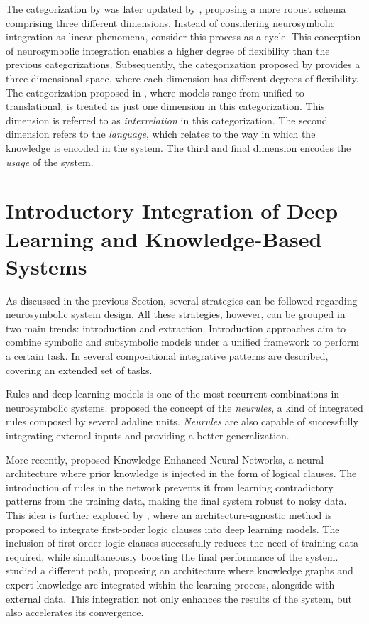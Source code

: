 The categorization by \cite{hilario_overview_nodate} was later updated by \cite{bader_dimensions_2005}, proposing a more robust schema comprising three different dimensions. Instead of considering neurosymbolic integration as linear phenomena, \cite{bader_dimensions_2005} consider this process as a cycle. This conception of neurosymbolic integration enables a higher degree of flexibility than the previous categorizations. Subsequently, the categorization proposed by \cite{bader_dimensions_2005} provides a three-dimensional space, where each dimension has different degrees of flexibility. The categorization proposed in \cite{hilario_overview_nodate}, where models range from unified to translational, is treated as just one dimension in this categorization. This dimension is referred to as \textit{interrelation} in this categorization. The second dimension refers to the \textit{language}, which relates to the way in which the knowledge is encoded in the system. The third and final dimension encodes the \textit{usage} of the system.

\section{Introductory Integration of Deep Learning and Knowledge-Based Systems}  \label{sec:sota_dl_kb_intregration}

As discussed in the previous Section, several strategies can be followed regarding neurosymbolic system design. All these strategies, however, can be grouped in two main trends: introduction and extraction. Introduction approaches aim to combine symbolic and subsymbolic models under a unified framework to perform a certain task. In \cite{van_bekkum_modular_2021} several compositional integrative patterns are described, covering an extended set of tasks. 

Rules and deep learning models is one of the most recurrent combinations in neurosymbolic systems. \cite{hatzilygeroudis_integrated_2010} proposed the concept of the \textit{neurules}, a kind of integrated rules composed by several adaline units. \textit{Neurules} are also capable of successfully integrating external inputs and providing a better generalization. 

More recently, \cite{daniele_knowledge_2019} proposed Knowledge Enhanced Neural Networks, a neural architecture where prior knowledge is injected in the form of logical clauses. The introduction of rules in the network prevents it from learning contradictory patterns from the training data, making the final system robust to noisy data. This idea is further explored by \cite{roychowdhury_regularizing_2021}, where an architecture-agnostic method is proposed to integrate first-order logic clauses into deep learning models. The inclusion of first-order logic clauses successfully reduces the need of training data required, while simultaneously boosting the final performance of the system. \cite{kursuncu_knowledge_2020} studied a different path, proposing an architecture where knowledge graphs and expert knowledge are integrated within the learning process, alongside with external data. This integration not only enhances the results of the system, but also accelerates its convergence.

